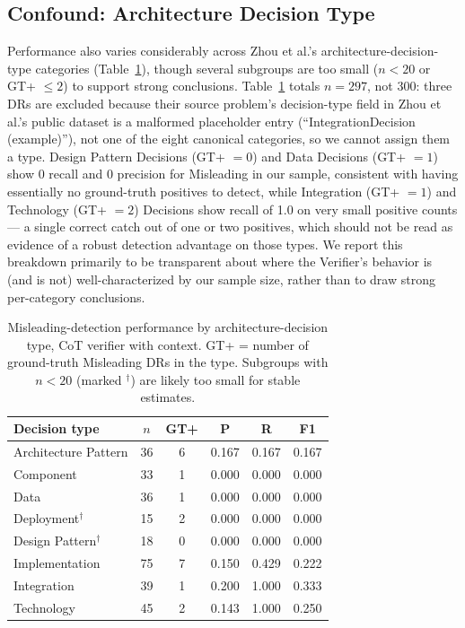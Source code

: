 \documentclass[runningheads]{llncs}
\begin{document}
\subsection{Confound: Architecture Decision Type}
Performance also varies considerably across Zhou et al.'s architecture-decision-type categories (Table~\ref{tab:decision-type}), though several subgroups are too small ($n<20$ or GT+ $\leq 2$) to support strong conclusions. Table~\ref{tab:decision-type} totals $n=297$, not 300: three DRs are excluded because their source problem's decision-type field in Zhou et al.'s public dataset is a malformed placeholder entry (``IntegrationDecision (example)''), not one of the eight canonical categories, so we cannot assign them a type. Design Pattern Decisions (GT+ $=0$) and Data Decisions (GT+ $=1$) show 0 recall and 0 precision for Misleading in our sample, consistent with having essentially no ground-truth positives to detect, while Integration (GT+ $=1$) and Technology (GT+ $=2$) Decisions show recall of 1.0 on very small positive counts --- a single correct catch out of one or two positives, which should not be read as evidence of a robust detection advantage on those types. We report this breakdown primarily to be transparent about where the Verifier's behavior is (and is not) well-characterized by our sample size, rather than to draw strong per-category conclusions.

\begin{table}[t]
\centering
\caption{Misleading-detection performance by architecture-decision type, CoT verifier with context. GT+ = number of ground-truth Misleading DRs in the type. Subgroups with $n<20$ (marked $^\dagger$) are likely too small for stable estimates.}
\label{tab:decision-type}
\begin{tabular}{lccccc}
\toprule
Decision type & $n$ & GT+ & P & R & F1 \\
\midrule
Architecture Pattern & 36 & 6 & 0.167 & 0.167 & 0.167 \\
Component & 33 & 1 & 0.000 & 0.000 & 0.000 \\
Data & 36 & 1 & 0.000 & 0.000 & 0.000 \\
Deployment$^\dagger$ & 15 & 2 & 0.000 & 0.000 & 0.000 \\
Design Pattern$^\dagger$ & 18 & 0 & 0.000 & 0.000 & 0.000 \\
Implementation & 75 & 7 & 0.150 & 0.429 & 0.222 \\
Integration & 39 & 1 & 0.200 & 1.000 & 0.333 \\
Technology & 45 & 2 & 0.143 & 1.000 & 0.250 \\
\bottomrule
\end{tabular}
\end{table}
\end{document}
